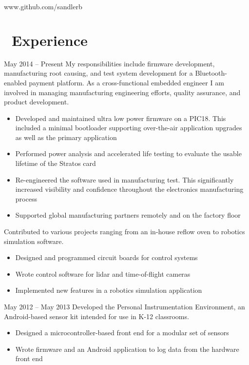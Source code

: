 \documentclass{resume}
\begin{document}


            {www.github.com/sandlerb}
 
\section{\faWrench\ Experience}
          {May 2014 -- Present}
My responsibilities include firmware development, manufacturing
root causing, and test system development for a Bluetooth-enabled payment
platform.  As a cross-functional embedded engineer I am involved in managing
manufacturing engineering efforts, quality assurance, and product development.
\begin{itemize}
  \item Developed and maintained ultra low power firmware on a PIC18. This
      included a minimal bootloader supporting over-the-air application
      upgrades as well as the primary application
  \item Performed power analysis and accelerated life testing to evaluate the
      usable lifetime of the Stratos card
  \item Re-engineered the software used in manufacturing test. This 
      significantly increased visibility and confidence throughout the 
      electronics manufacturing process
  \item Supported global manufacturing partners remotely and on the factory floor
\end{itemize}
\vspace{3mm}

Contributed to various projects ranging from an in-house reflow oven to robotics
simulation software.
\begin{itemize}
  \item Designed and programmed circuit boards for control systems
  \item Wrote control software for lidar and time-of-flight cameras
  \item Implemented new features in a robotics simulation application
\end{itemize}
\vspace{3mm}

          {May 2012 -- May 2013}
Developed the Personal Instrumentation Environment, an Android-based sensor
kit intended for use in K-12 classrooms.
\begin{itemize}
  \item Designed a microcontroller-based front end for a modular set of sensors
  \item Wrote firmware and an Android application to log data from the hardware
      front end
\end{itemize}
\vspace{3mm}
\end{document}
